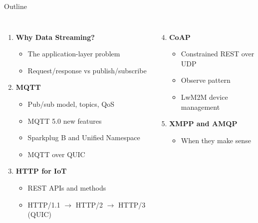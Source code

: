 \documentclass[aspectratio=169,11pt]{beamer}
\begin{document}
\begin{frame}{Outline}
    \begin{columns}
        \begin{enumerate}
            \item \textbf{Why Data Streaming?}
            \begin{itemize}
                \item The application-layer problem
                \item Request/response vs publish/subscribe
            \end{itemize}
            
            \item \textbf{MQTT}
            \begin{itemize}
                \item Pub/sub model, topics, QoS
                \item MQTT 5.0 new features
                \item Sparkplug B and Unified Namespace
                \item MQTT over QUIC
            \end{itemize}
            
            \item \textbf{HTTP for IoT}
            \begin{itemize}
                \item REST APIs and methods
                \item HTTP/1.1 $\rightarrow$ HTTP/2 $\rightarrow$ HTTP/3 (QUIC)
            \end{itemize}
        \end{enumerate}
        
        \begin{enumerate}
            \setcounter{enumi}{3}
            \item \textbf{CoAP}
            \begin{itemize}
                \item Constrained REST over UDP
                \item Observe pattern
                \item LwM2M device management
            \end{itemize}
            
            \item \textbf{XMPP and AMQP}
            \begin{itemize}
                \item When they make sense
            \end{itemize}
            

\end{enumerate}
\end{columns}
\end{frame}
\end{document}
